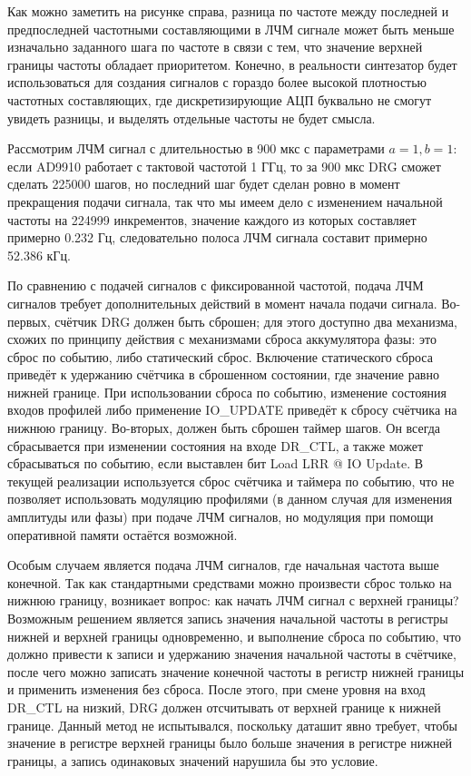 \documentclass[rusmathsym, eqnumwithinsec, amspack, hyperref]{bomgost}
\begin{document}
Как можно заметить на рисунке справа, разница по частоте между последней и предпоследней частотными составляющими в ЛЧМ сигнале может быть меньше изначально заданного шага по частоте в связи с тем, что значение верхней границы частоты обладает приоритетом. Конечно, в реальности синтезатор будет использоваться для создания сигналов с гораздо более высокой плотностью частотных составляющих, где дискретизирующие АЦП буквально не смогут увидеть разницы, и выделять отдельные частоты не будет смысла.

Рассмотрим ЛЧМ сигнал с длительностью в 900 мкс с параметрами $a=1, b=1$: если AD9910 работает с тактовой частотой 1 ГГц, то за 900 мкс DRG сможет сделать 225000 шагов, но последний шаг будет сделан ровно в момент прекращения подачи сигнала, так что мы имеем дело с изменением начальной частоты на 224999 инкрементов, значение каждого из которых составляет примерно 0.232 Гц, следовательно полоса ЛЧМ сигнала составит примерно 52.386 кГц.

По сравнению с подачей сигналов с фиксированной частотой, подача ЛЧМ сигналов требует дополнительных действий в момент начала подачи сигнала. Во-первых, счётчик DRG должен быть сброшен; для этого доступно два механизма, схожих по принципу действия с механизмами сброса аккумулятора фазы: это сброс по событию, либо статический сброс. Включение статического сброса приведёт к удержанию счётчика в сброшенном состоянии, где значение равно нижней границе. При использовании сброса по событию, изменение состояния входов профилей либо применение IO\_UPDATE приведёт к сбросу счётчика на нижнюю границу. Во-вторых, должен быть сброшен таймер шагов. Он всегда сбрасывается при изменении состояния на входе DR\_CTL, а также может сбрасываться по событию, если выставлен бит Load LRR @ IO Update. В текущей реализации используется сброс счётчика и таймера по событию, что не позволяет использовать модуляцию профилями (в данном случая для изменения амплитуды или фазы) при подаче ЛЧМ сигналов, но модуляция при помощи оперативной памяти остаётся возможной.

Особым случаем является подача ЛЧМ сигналов, где начальная частота выше конечной. Так как стандартными средствами можно произвести сброс только на нижнюю границу, возникает вопрос: как начать ЛЧМ сигнал с верхней границы? Возможным решением является запись значения начальной частоты в регистры нижней и верхней границы одновременно, и выполнение сброса по событию, что должно привести к записи и удержанию значения начальной частоты в счётчике, после чего можно записать значение конечной частоты в регистр нижней границы и применить изменения без сброса. После этого, при смене уровня на вход DR\_CTL на низкий, DRG должен отсчитывать от верхней границе к нижней границе. Данный метод не испытывался, поскольку даташит явно требует, чтобы значение в регистре верхней границы было больше значения в регистре нижней границы, а запись одинаковых значений нарушила бы это условие.
\end{document}
